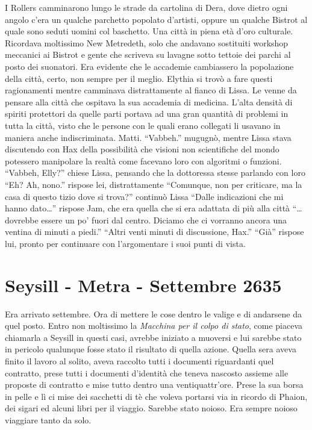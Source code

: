     I Rollers camminarono lungo le strade da cartolina di Dera, dove dietro
    ogni angolo c'era un qualche parchetto popolato d'artisti, oppure un
    qualche Bistrot al quale sono seduti uomini col baschetto. Una città in
    piena età d'oro culturale. Ricordava moltissimo New Metredeth, solo che
    andavano sostituiti workshop meccanici ai Bistrot e gente che scriveva
    su lavagne sotto tettoie dei parchi al posto dei suonatori. Era
    evidente che le accademie cambiassero la popolazione della città,
    certo, non sempre per il meglio. Elythia si trovò a fare questi
    ragionamenti mentre camminava distrattamente al fianco di Lissa. Le
    venne da pensare alla città che ospitava la sua accademia di medicina.
    L'alta densità di spiriti protettori da quelle parti portava ad una
    gran quantità di problemi in tutta la città, visto che le persone con
    le quali erano collegati li usavano in maniera anche indiscriminata.
    Matti. ``Vabbeh.'' mugugnò, mentre Lissa stava discutendo con Hax della
    possibilità che visioni non scientifiche del mondo potessero manipolare
    la realtà come facevano loro con algoritmi o funzioni. ``Vabbeh,
    Elly?'' chiese Lissa, pensando che la dottoressa stesse parlando con
    loro ``Eh? Ah, nono.'' rispose lei, distrattamente ``Comunque, non per
    criticare, ma la casa di questo tizio dove si trova?'' continuò Lissa
    ``Dalle indicazioni che mi hanno dato\dots{}'' rispose Jam, che era
    quella che si era adattata di più alla città ``\dots{}dovrebbe essere un
    po' fuori dal centro. Diciamo che ci vorranno ancora una ventina di
    minuti a piedi.'' ``Altri venti minuti di discussione, Hax.'' ``Già''
    rispose lui, pronto per continuare con l'argomentare i suoi punti di
    vista.

  \section{Seysill - Metra - Settembre 2635}
    
    Era arrivato settembre. Ora di mettere le cose dentro le valige e di
    andarsene da quel posto. Entro non moltissimo la \emph{Macchina per il
    colpo di stato}, come piaceva chiamarla a Seysill in questi casi,
    avrebbe iniziato a muoversi e lui sarebbe stato in pericolo qualunque
    fosse stato il risultato di quella azione. Quella sera aveva finito il
    lavoro al solito, aveva raccolto tutti i documenti riguardanti quel
    contratto, prese tutti i documenti d'identità che teneva nascosto
    assieme alle proposte di contratto e mise tutto dentro una
    ventiquattr'ore. Prese la sua borsa in pelle e lì ci mise dei sacchetti
    di tè che voleva portarsi via in ricordo di Phaion, dei sigari ed
    alcuni libri per il viaggio. Sarebbe stato noioso. Era sempre noioso
    viaggiare tanto da solo.
    
